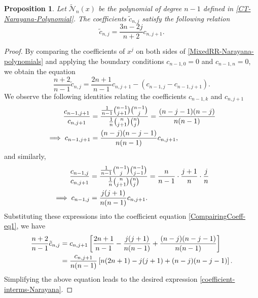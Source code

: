 \documentclass[final,3p,times,12pt]{elsarticle}
\newtheorem{proposition}{Proposition}[section]
\numberwithin{equation}{section}  %
\begin{document}
\begin{proposition}
	Let $\tilde{\mathcal{N}}_n(x)$ be the polynomial of degree $n-1$ defined in \eqref{CT-Narayana-Polynomial}. The coefficients $\tilde{c}_{n,j}$ satisfy the following relation
	\begin{equation}\label{coefficient-interms-Narayana}
		\tilde{c}_{n,j} = \frac{3n - 2j}{n + 2} c_{n, j+1}.
	\end{equation}
\end{proposition}

\begin{proof}
	By comparing the coefficients of $x^j$ on both sides of \eqref{MixedRR-Narayana-polynomials} and applying the boundary conditions $c_{n-1,0}=0$ and $c_{n-1,n}=0$, we obtain the equation
	\begin{equation}\label{CompairingCoeff-eq1}
		\frac{n+2}{n-1} \tilde{c}_{n,j} = \frac{2n+1}{n-1} c_{n,j+1} - (c_{n-1, j} - c_{n-1, j+1}).
	\end{equation}
	We observe the following identities relating the coefficients $c_{n-1,k}$ and $c_{n, j+1}$
	\begin{align}
		\frac{c_{n-1,j+1}}{c_{n,j+1}} &= \frac{\frac{1}{n-1}\binom{n-1}{j+1}\binom{n-1}{j}}{\frac{1}{n}\binom{n}{j+1}\binom{n}{j}} = \frac{(n-j-1)(n-j)}{n(n-1)}  \notag \\
		\implies c_{n-1, j+1} &= \frac{(n-j)(n-j-1)}{n(n-1)} c_{n,j+1},
	\end{align}
	and similarly,
	\begin{align}
		\frac{c_{n-1,j}}{c_{n,j+1}} &= \frac{\frac{1}{n-1}\binom{n-1}{j}\binom{n-1}{j-1}}{\frac{1}{n}\binom{n}{j+1}\binom{n}{j}} = \frac{n}{n-1} \cdot \frac{j+1}{n} \cdot \frac{j}{n} \notag \\
		\implies c_{n-1, j} &= \frac{j(j+1)}{n(n-1)} c_{n,j+1}.
	\end{align}
	Substituting these expressions into the coefficient equation \eqref{CompairingCoeff-eq1}, we have
	\begin{align*}
		\frac{n+2}{n-1} \tilde{c}_{n,j} &= c_{n,j+1} \left[ \frac{2n+1}{n-1} - \frac{j(j+1)}{n(n-1)} + \frac{(n-j)(n-j-1)}{n(n-1)} \right] \notag \\
		&= \frac{c_{n,j+1}}{n(n-1)} \left[ n(2n+1) - j(j+1) + (n-j)(n-j-1) \right].
	\end{align*}
	Simplifying the  above equation  leads to the desired expression \eqref{coefficient-interms-Narayana}.
\end{proof}

\end{document}
